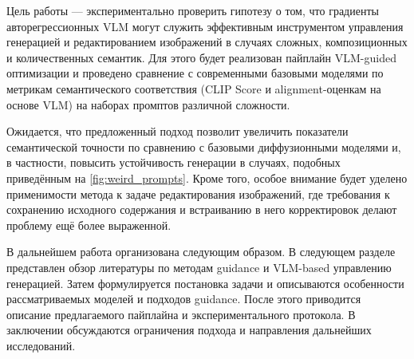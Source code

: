 Цель работы — экспериментально проверить гипотезу о том, что градиенты авторегрессионных VLM могут служить эффективным инструментом управления генерацией и редактированием изображений в случаях сложных, композиционных и количественных семантик. Для этого будет реализован пайплайн VLM-guided оптимизации и проведено сравнение с современными базовыми моделями по метрикам семантического соответствия (CLIP Score и alignment-оценкам на основе VLM) на наборах промптов различной сложности.

Ожидается, что предложенный подход позволит увеличить показатели семантической точности по сравнению с базовыми диффузионными моделями и, в частности, повысить устойчивость генерации в случаях, подобных приведённым на \autoref{fig:weird_prompts}. Кроме того, особое внимание будет уделено применимости метода к задаче редактирования изображений, где требования к сохранению исходного содержания и встраиванию в него корректировок делают проблему ещё более выраженной.

В дальнейшем работа организована следующим образом. В следующем разделе представлен обзор литературы по методам guidance и VLM-based управлению генерацией. Затем формулируется постановка задачи и описываются особенности рассматриваемых моделей и подходов guidance. После этого приводится описание предлагаемого пайплайна и экспериментального протокола. В заключении обсуждаются ограничения подхода и направления дальнейших исследований.